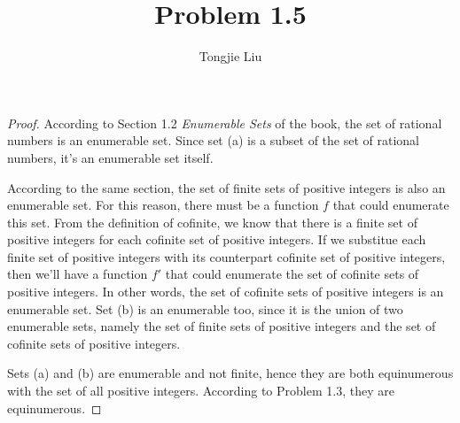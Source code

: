 \documentclass{article}
\title{Problem 1.5}
\author{Tongjie Liu}
\begin{document}
\maketitle


\begin{proof}
	According to Section 1.2 \textit{Enumerable Sets} of the book,
the set of rational numbers is an enumerable set. Since set (a) is a
subset of the set of rational numbers, it's an enumerable set itself.

	According to the same section, the set of finite sets of positive
integers is also an enumerable set. For this reason, there must be a
function $f$ that could enumerate this set. From the definition of cofinite,
we know that there is a finite set of positive integers for each cofinite
set of positive integers. If we substitue each finite set of positive integers
with its counterpart cofinite set of positive integers, then we'll have a
function $f'$ that could enumerate the set of cofinite sets of positive
integers. In other words, the set of cofinite sets of positive integers
is an enumerable set. Set (b) is an enumerable too, since it is the union
of two enumerable sets, namely the set of finite sets of positive integers
and the set of cofinite sets of positive integers.

	Sets (a) and (b) are enumerable and not finite, hence they are both
equinumerous with the set of all positive integers. According to Problem 1.3,
they are equinumerous. \qedhere
\end{proof}
\end{document}
